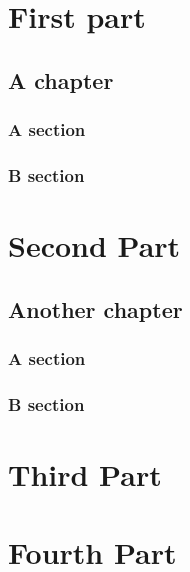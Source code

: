 \documentclass{book}
\begin{document}
\tableofcontents

\part{First part}
	\chapter{A chapter}
		\section{A section}
		\section{B section}

\part{Second Part}
	\chapter{Another chapter}
		\section{A section}
		\section{B section}

\part{Third Part}

\part{Fourth Part}
\end{document}
